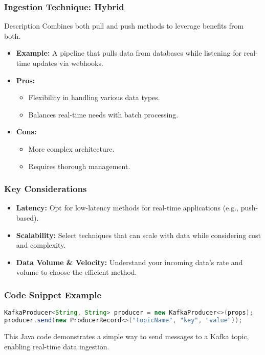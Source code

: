 \documentclass[aspectratio=169]{beamer}
\begin{document}
\begin{frame}
    \frametitle{Ingestion Technique: Hybrid}
    \begin{block}{Description}
        Combines both pull and push methods to leverage benefits from both.
    \end{block}
    \begin{itemize}
        \item \textbf{Example:} A pipeline that pulls data from databases while listening for real-time updates via webhooks.
        \item \textbf{Pros:}
            \begin{itemize}
                \item Flexibility in handling various data types.
                \item Balances real-time needs with batch processing.
            \end{itemize}
        \item \textbf{Cons:}
            \begin{itemize}
                \item More complex architecture.
                \item Requires thorough management.
            \end{itemize}
    \end{itemize}
\end{frame}

\begin{frame}
    \frametitle{Key Considerations}
    \begin{itemize}
        \item \textbf{Latency:} Opt for low-latency methods for real-time applications (e.g., push-based).
        \item \textbf{Scalability:} Select techniques that can scale with data while considering cost and complexity.
        \item \textbf{Data Volume \& Velocity:} Understand your incoming data's rate and volume to choose the efficient method.
    \end{itemize}
\end{frame}

\begin{frame}[fragile]
    \frametitle{Code Snippet Example}
    \begin{lstlisting}[language=Java]
KafkaProducer<String, String> producer = new KafkaProducer<>(props);
producer.send(new ProducerRecord<>("topicName", "key", "value"));
    \end{lstlisting}
    This Java code demonstrates a simple way to send messages to a Kafka topic, enabling real-time data ingestion.
\end{frame}
\end{document}
